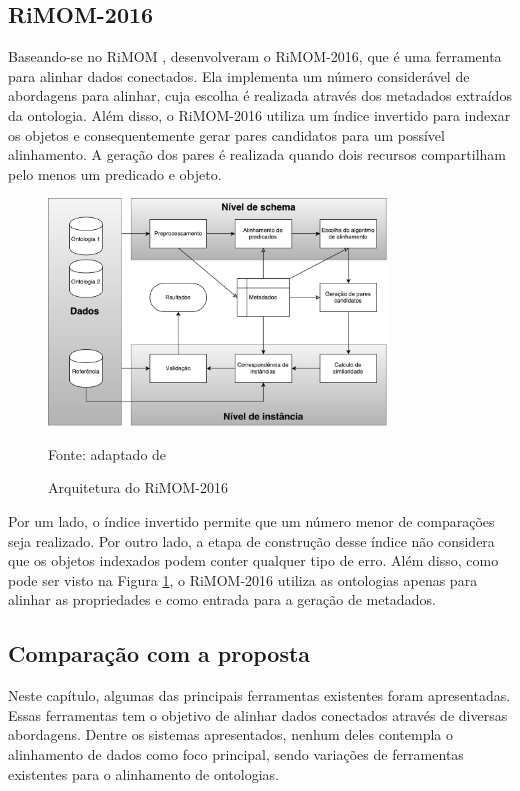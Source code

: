 \subsection{RiMOM-2016}
Baseando-se no RiMOM  \cite{li2009rimom}, \cite{zhang2016rimom} desenvolveram o RiMOM-2016, que é uma ferramenta para alinhar dados conectados. Ela implementa um número considerável de abordagens para alinhar, cuja escolha é realizada através dos metadados extraídos da ontologia. Além disso, o RiMOM-2016 utiliza um índice invertido para indexar os objetos e consequentemente gerar pares candidatos para um possível alinhamento. A geração dos pares é realizada quando dois recursos compartilham pelo menos um predicado e objeto.

\begin{figure}[!ht]
	\centering
	\includegraphics[width=0.8\textwidth]{./imagens/rimom_2016.pdf}
	\caption{Arquitetura do RiMOM-2016}
	\footnotesize{Fonte: adaptado de \cite{zhang2016rimom}}
	\label{fig:rimom}
\end{figure}

Por um lado, o índice invertido permite que um número menor de comparações seja realizado. Por outro lado, a etapa de construção desse índice não considera que os objetos indexados podem conter qualquer tipo de erro. Além disso, como pode ser visto na Figura \ref{fig:rimom}, o RiMOM-2016 utiliza as ontologias apenas para alinhar as propriedades e como entrada para a geração de metadados.

\subsection{Comparação com a proposta}

Neste capítulo, algumas das principais ferramentas existentes foram apresentadas. Essas ferramentas tem o objetivo de alinhar dados conectados através de diversas abordagens. Dentre os sistemas apresentados, nenhum deles contempla o alinhamento de dados como foco principal, sendo variações de ferramentas existentes para o alinhamento de ontologias.

